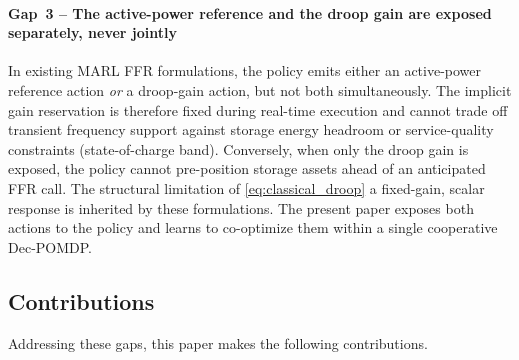 \documentclass[lettersize,journal]{IEEEtran}
\begin{document}
\paragraph*{Gap~3 -- The active-power reference and the droop gain are exposed separately, never jointly}

In existing MARL FFR formulations, the policy emits either an active-power reference action \emph{or} a droop-gain action, but not both simultaneously. The implicit gain reservation is therefore fixed during real-time execution and cannot trade off transient frequency support against storage energy headroom or service-quality constraints (state-of-charge band). Conversely, when only the droop gain is exposed, the policy cannot pre-position storage assets ahead of an anticipated FFR call. The structural limitation of \eqref{eq:classical_droop} a fixed-gain, scalar response is inherited by these formulations. The present paper exposes both actions to the policy and learns to co-optimize them within a single cooperative Dec-POMDP.

\subsection{Contributions}
\label{ssec:contrib}

Addressing these gaps, this paper makes the
following contributions.
\end{document}
